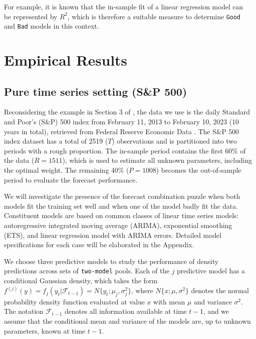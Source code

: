 \documentclass{monashthesis}
\begin{document}
For example, it is known that the in-sample fit of a linear regression model can be represented by \(R^2\), which is therefore a suitable measure to determine \texttt{Good} and \texttt{Bad} models in this context.

\hypertarget{empirical-results}{%
\chapter{Empirical Results}\label{empirical-results}}

\hypertarget{sp500}{%
\section{Pure time series setting (S\&P 500)}\label{sp500}}

Reconsidering the example in Section 3 of \textcite{GA11}, the data we use is the daily Standard and Poor's (S\&P) 500 index from February 11, 2013 to February 10, 2023 (10 years in total), retrieved from Federal Reserve Economic Data \autocite{SP500}. The S\&P 500 index dataset has a total of 2519 (\(T\)) observations and is partitioned into two periods with a rough proportion. The in-sample period contains the first 60\% of the data (\(R = 1511\)), which is used to estimate all unknown parameters, including the optimal weight. The remaining 40\% (\(P = 1008\)) becomes the out-of-sample period to evaluate the forecast performance.

We will investigate the presence of the forecast combination puzzle when both models fit the training set well and when one of the model badly fit the data. Constituent models are based on common classes of linear time series models: autoregressive integrated moving average (ARIMA), exponential smoothing (ETS), and linear regression model with ARIMA errors. Detailed model specifications for each case will be elaborated in the Appendix.

We choose three predictive models to study the performance of density predictions across sets of \texttt{two-model} pools. Each of the \(j\) predictive model has a conditional Gaussian density, which takes the form \(f^{(j)}(y)=f_j(y_t|\mathcal{F}_{t-1})=N\{y_t; \mu_j, \sigma^2_j\}\), where \(N\{x; \mu, \sigma^2\}\) denotes the normal probability density function evaluated at value \(x\) with mean \(\mu\) and variance \(\sigma^2\). The notation \(\mathcal{F}_{t-1}\) denotes all information available at time \(t-1\), and we assume that the conditional mean and variance of the models are, up to unknown parameters, known at time \(t-1\).
\end{document}
